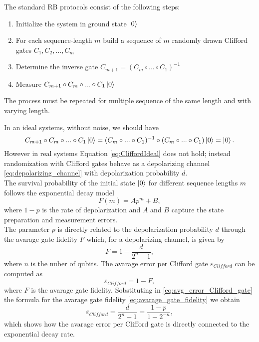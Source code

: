 The standard RB protocols consist of the following steps:\begin{enumerate}\label{routine:RB}
    \item Initialize the system in ground state $\ket{0}$
    \item For each sequence-length $m$ build a sequence of $m$ randomly drawn Clifford gates $C_1, C_2, ..., C_m$
    \item Determine the inverse gate $C_{m+1}=(C_m\circ...\circ C_1)^{-1}$
    \item Measure $C_{m+1}\circ C_m \circ ...\circ C_1 \ket{0}$
\end{enumerate}
The process must be repeated for multiple sequence of the same length and with varying length.

In an ideal systems, without noise, we should have 
\begin{equation}\label{eq:CliffordIdeal}
    C_{m+1}\circ C_m \circ ...\circ C_1 \ket{0} = (C_m\circ...\circ C_1)^{-1}\circ(C_m\circ...\circ C_1)\ket{0} = \ket{0}.
\end{equation}
However in real systems Equation \ref{eq:CliffordIdeal} does not hold; instead randomization with Clifford gates behave as a depolarizing channel \ref{eq:depolarizing_channel} with depolarization probability $d$.\\
The survival probability of the initial state $\ket{0}$ for different sequence lengths $m$ follows the exponential decay model \begin{equation}\label{eq:RB_decay}
    F(m) = Ap^m +B,
\end{equation}
where $1-p$ is the rate of depolarization and $A$ and $B$ capture the state preparation and measurement errors.\\
The parameter $p$ is directly related to the depolarization probability $d$ through the avarage gate fidelity $F$ which, for a depolarizing channel, is given by \begin{equation}
    F = 1 - \frac{d}{2^n - 1}\label{eq:avarage_gate_fidelity},
\end{equation}
where $n$ is the nuber of qubits.
The avarage error per Clifford gate $\varepsilon_{Clifford}$ can be computed as \begin{equation}
    \varepsilon_{Clifford} = 1 - F \label{eq:avg_error_Clifford_gate},
\end{equation}
where $F$ is the avarage gate fidelity. 
Sobstituting in \ref{eq:avg_error_Clifford_gate} the formula for the avarage gate fidelity \ref{eq:avarage_gate_fidelity} we obtain \begin{equation}
    \varepsilon_{Clifford} = \frac{d}{2^n -1} = \frac{1-p}{1-2^{-n}},
\end{equation}
which shows how the avarage error per Clifford gate is directly connected to the exponential decay rate.

